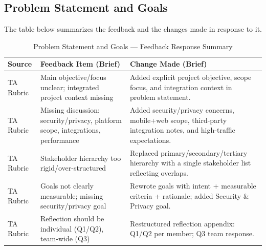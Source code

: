 \documentclass{article}
\begin{document}
\subsection{Problem Statement and Goals}
The table below summarizes the feedback and the changes made in response to it.
\begin{table}[H]
\caption{Problem Statement and Goals --- Feedback Response Summary} \label{TblPSGFeedbackResponse}
\begin{tabularx}{\textwidth}{lXX}
\toprule
\textbf{Source} & \textbf{Feedback Item (Brief)} & \textbf{Change Made (Brief)} \\
\midrule
TA Rubric & Main objective/focus unclear; integrated project context missing & Added explicit project objective, scope focus, and integration context in problem statement. \\
TA Rubric & Missing discussion: security/privacy, platform scope, integrations, performance & Added security/privacy concerns, mobile+web scope, third-party integration notes, and high-traffic expectations. \\
TA Rubric & Stakeholder hierarchy too rigid/over-structured & Replaced primary/secondary/tertiary hierarchy with a single stakeholder list reflecting overlaps. \\
TA Rubric & Goals not clearly measurable; missing security/privacy goal & Rewrote goals with intent + measurable criteria + rationale; added Security \& Privacy goal. \\
TA Rubric & Reflection should be individual (Q1/Q2), team-wide (Q3) & Restructured reflection appendix: Q1/Q2 per member; Q3 team response. \\
\bottomrule
\end{tabularx}
\end{table}

\end{document}
